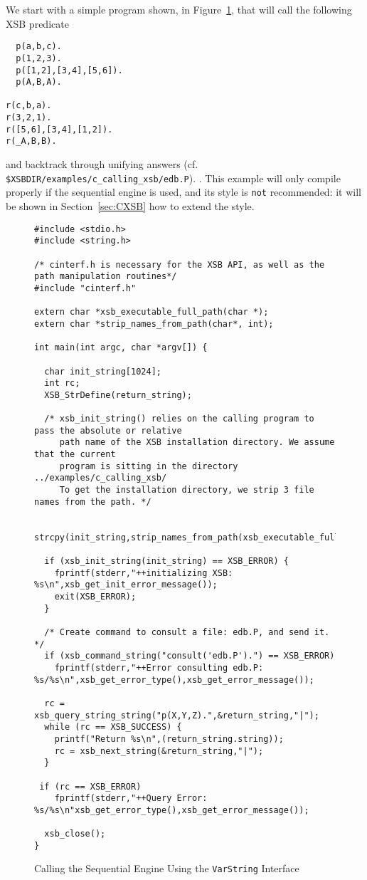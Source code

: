 We start with a simple program shown, in Figure~\ref{fig:varstringex},
that will call the following XSB predicate
%
\begin{small}
\begin{verbatim}
  p(a,b,c).
  p(1,2,3).
  p([1,2],[3,4],[5,6]).
  p(A,B,A).

r(c,b,a).
r(3,2,1).
r([5,6],[3,4],[1,2]).
r(_A,B,B).

\end{verbatim}
\end{small}
%
and backtrack through unifying answers (cf. {\tt
  \$XSBDIR/examples/c\_calling\_xsb/edb.P}).  .  This example will
only compile properly if the sequential engine is used, and its style
is {\tt not} recommended: it will be shown in Section~\ref{sec:CXSB}
how to extend the style.
%
\begin{figure}[hbtp]
\begin{small}
\begin{verbatim}
#include <stdio.h>
#include <string.h>

/* cinterf.h is necessary for the XSB API, as well as the path manipulation routines*/
#include "cinterf.h"

extern char *xsb_executable_full_path(char *);
extern char *strip_names_from_path(char*, int);

int main(int argc, char *argv[]) { 

  char init_string[1024];
  int rc;
  XSB_StrDefine(return_string);

  /* xsb_init_string() relies on the calling program to pass the absolute or relative
     path name of the XSB installation directory. We assume that the current
     program is sitting in the directory ../examples/c_calling_xsb/
     To get the installation directory, we strip 3 file names from the path. */

  strcpy(init_string,strip_names_from_path(xsb_executable_full_path(argv[0]),3));

  if (xsb_init_string(init_string) == XSB_ERROR) {
    fprintf(stderr,"++initializing XSB: %s\n",xsb_get_init_error_message());
    exit(XSB_ERROR);
  }

  /* Create command to consult a file: edb.P, and send it. */
  if (xsb_command_string("consult('edb.P').") == XSB_ERROR)
    fprintf(stderr,"++Error consulting edb.P: %s/%s\n",xsb_get_error_type(),xsb_get_error_message());

  rc = xsb_query_string_string("p(X,Y,Z).",&return_string,"|");
  while (rc == XSB_SUCCESS) {
    printf("Return %s\n",(return_string.string));
    rc = xsb_next_string(&return_string,"|");
  }
 
 if (rc == XSB_ERROR) 
    fprintf(stderr,"++Query Error: %s/%s\n"xsb_get_error_type(),xsb_get_error_message());

  xsb_close();     
}
\end{verbatim}
\end{small}
\caption{Calling the Sequential Engine Using the {\tt VarString} Interface} \label{fig:varstringex}
\end{figure}

